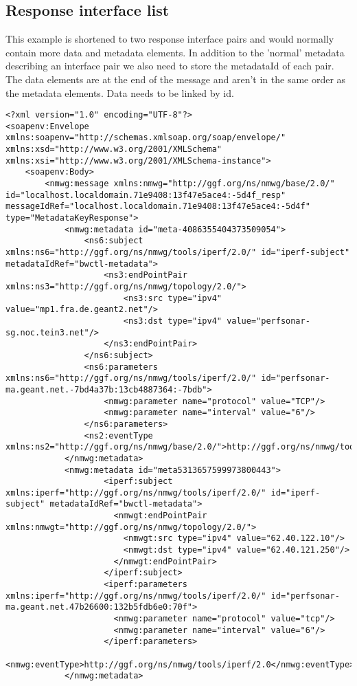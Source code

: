 \documentclass[a4paper,12pt,titlepage,hidelinks,fleqn]{article}
\begin{document}
\subsection{Response interface list}
\begin{flushleft}
This example is shortened to two response interface pairs and would normally contain more data and metadata elements.
In addition to the 'normal' metadata describing an interface pair we also need to store the metadataId of each pair. The data elements are at the end of the message and aren't in the same order as the metadata elements. Data needs to be linked by id.
\begin{framed}
\begin{lstlisting}
<?xml version="1.0" encoding="UTF-8"?>
<soapenv:Envelope xmlns:soapenv="http://schemas.xmlsoap.org/soap/envelope/" xmlns:xsd="http://www.w3.org/2001/XMLSchema" xmlns:xsi="http://www.w3.org/2001/XMLSchema-instance">
	<soapenv:Body>
		<nmwg:message xmlns:nmwg="http://ggf.org/ns/nmwg/base/2.0/" id="localhost.localdomain.71e9408:13f47e5ace4:-5d4f_resp" messageIdRef="localhost.localdomain.71e9408:13f47e5ace4:-5d4f" type="MetadataKeyResponse">
			<nmwg:metadata id="meta-4086355404373509054">
				<ns6:subject xmlns:ns6="http://ggf.org/ns/nmwg/tools/iperf/2.0/" id="iperf-subject" metadataIdRef="bwctl-metadata">
					<ns3:endPointPair xmlns:ns3="http://ggf.org/ns/nmwg/topology/2.0/">
						<ns3:src type="ipv4" value="mp1.fra.de.geant2.net"/>
						<ns3:dst type="ipv4" value="perfsonar-sg.noc.tein3.net"/>
					</ns3:endPointPair>
				</ns6:subject>
				<ns6:parameters xmlns:ns6="http://ggf.org/ns/nmwg/tools/iperf/2.0/" id="perfsonar-ma.geant.net.-7bd4a37b:13cb4887364:-7bdb">
					<nmwg:parameter name="protocol" value="TCP"/>
					<nmwg:parameter name="interval" value="6"/>
				</ns6:parameters>
				<ns2:eventType xmlns:ns2="http://ggf.org/ns/nmwg/base/2.0/">http://ggf.org/ns/nmwg/tools/iperf/2.0</ns2:eventType>
			</nmwg:metadata>
			<nmwg:metadata id="meta5313657599973800443">
			        <iperf:subject xmlns:iperf="http://ggf.org/ns/nmwg/tools/iperf/2.0/" id="iperf-subject" metadataIdRef="bwctl-metadata">
			          <nmwgt:endPointPair xmlns:nmwgt="http://ggf.org/ns/nmwg/topology/2.0/">
			            <nmwgt:src type="ipv4" value="62.40.122.10"/>
			            <nmwgt:dst type="ipv4" value="62.40.121.250"/>
			          </nmwgt:endPointPair>
			        </iperf:subject>
			        <iperf:parameters xmlns:iperf="http://ggf.org/ns/nmwg/tools/iperf/2.0/" id="perfsonar-ma.geant.net.47b26600:132b5fdb6e0:70f">
			          <nmwg:parameter name="protocol" value="tcp"/>
			          <nmwg:parameter name="interval" value="6"/>
			        </iperf:parameters>
			        <nmwg:eventType>http://ggf.org/ns/nmwg/tools/iperf/2.0</nmwg:eventType>
		 	</nmwg:metadata>
		 	

\end{lstlisting}
\end{framed}
\end{flushleft}
\end{document}
